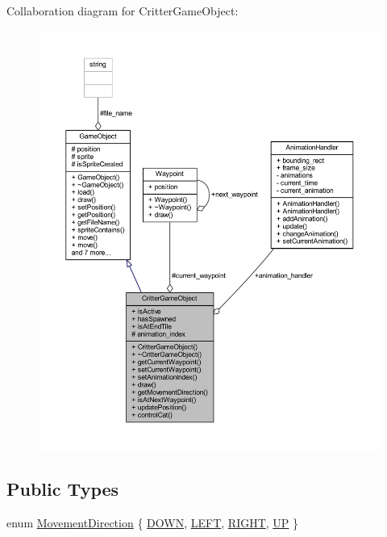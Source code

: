 Collaboration diagram for Critter\+Game\+Object\+:\nopagebreak
\begin{figure}[H]
\begin{center}
\leavevmode
\includegraphics[width=350pt]{class_critter_game_object__coll__graph}
\end{center}
\end{figure}
\subsection*{Public Types}
\begin{DoxyCompactItemize}
\item 
enum \hyperlink{class_critter_game_object_a8d07276919d937f6066395bc0e1febf2}{Movement\+Direction} \{ \hyperlink{class_critter_game_object_a8d07276919d937f6066395bc0e1febf2ae3b729130fb185c409e639345a7de9ed}{D\+O\+W\+N}, 
\hyperlink{class_critter_game_object_a8d07276919d937f6066395bc0e1febf2a02ac339d40e010941fad9c94f3826214}{L\+E\+F\+T}, 
\hyperlink{class_critter_game_object_a8d07276919d937f6066395bc0e1febf2a66b911e14441f191d1477b704dc354b1}{R\+I\+G\+H\+T}, 
\hyperlink{class_critter_game_object_a8d07276919d937f6066395bc0e1febf2ad339e5942cb7217912a66c55116b7676}{U\+P}
 \}
\end{DoxyCompactItemize}
